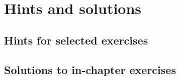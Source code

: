 \chapter{Hints and solutions}
\label{apxHintsSolutions}

\renewcommand\chaptername{Hints and solutions}

\newpage

\section{Hints for selected exercises}
\label{secHints}

\flushhints
\printhints

\newpage
\section{Solutions to in-chapter exercises}
\label{secSolutions}

\flushsolutions
\printsolutions
